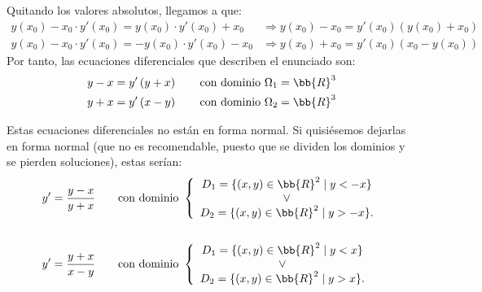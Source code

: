 \begin{ejercicio}
\begin{enumerate}
        Quitando los valores absolutos, llegamos a que:
        \begin{align*}
            y(x_0) - x_0\cdot y'(x_0) = y(x_0)\cdot y'(x_0) + x_0
            &\Longrightarrow y(x_0) - x_0 = y'(x_0)\left( y(x_0) + x_0 \right)\\
            y(x_0) - x_0\cdot y'(x_0) = -y(x_0)\cdot y'(x_0) - x_0
            &\Longrightarrow y(x_0) + x_0 = y'(x_0)\left( x_0 -y(x_0)\right)
        \end{align*}
        Por tanto, las ecuaciones diferenciales que describen el enunciado son:
        \begin{align*}
            y - x = y'\left( y + x \right) \qquad \text{con dominio } \Omega_1=\bb{R}^3\\
            y + x = y'\left( x - y \right) \qquad \text{con dominio } \Omega_2=\bb{R}^3
        \end{align*}

        Estas ecuaciones diferenciales no están en forma normal. Si quisiésemos dejarlas en forma normal (que no es recomendable, puesto que se dividen los dominios y se pierden soluciones), estas serían:
        \begin{align*}
            y' &= \dfrac{y - x}{y + x} \qquad \text{con dominio } \left\{\begin{array}{c}
                D_1=\{(x, y)\in \bb{R}^2 \mid y<-x\}\\
                \lor \\
                D_2=\{(x, y)\in \bb{R}^2 \mid y>-x\}.\\
            \end{array}\right. \\ \\
            y' &= \dfrac{y+x}{x-y} \qquad \text{con dominio } \left\{\begin{array}{c}
                D_1=\{(x, y)\in \bb{R}^2 \mid y<x\}\\
                \lor \\
                D_2=\{(x, y)\in \bb{R}^2 \mid y>x\}.\\
            \end{array}\right.
        \end{align*}
    \end{enumerate}
\end{ejercicio}


